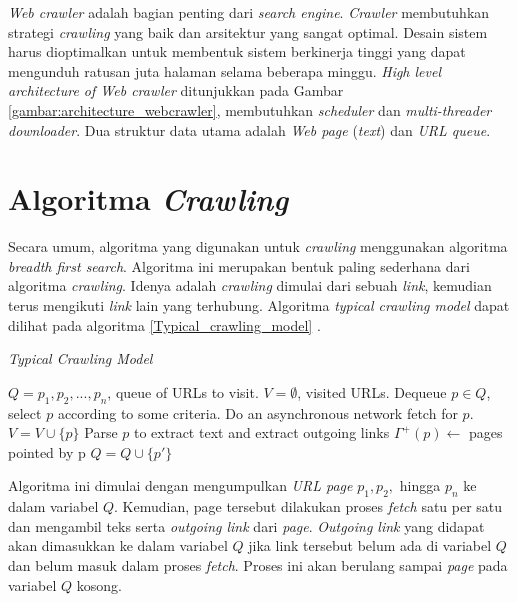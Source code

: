 \emph{Web crawler} adalah bagian penting dari \emph{search engine}. \emph{Crawler} membutuhkan strategi \emph{crawling} yang baik dan arsitektur yang sangat optimal. Desain sistem harus dioptimalkan untuk membentuk sistem berkinerja tinggi yang dapat mengunduh ratusan juta halaman selama beberapa minggu. \emph{High level architecture of Web crawler} ditunjukkan pada Gambar \ref{gambar:architecture_webcrawler}, membutuhkan \emph{scheduler} dan \emph{multi-threader downloader}. Dua struktur data utama adalah \emph{Web page} (\emph{text}) dan \emph{URL queue}.

\section{Algoritma \emph{Crawling}}

Secara umum, algoritma yang digunakan untuk \emph{crawling} menggunakan algoritma \emph{breadth first search}. Algoritma ini merupakan bentuk paling sederhana dari algoritma \textit{crawling}. Idenya adalah \textit{crawling} dimulai dari sebuah \emph{link}, kemudian terus mengikuti \emph{link} lain yang terhubung. Algoritma \emph{typical crawling model} dapat dilihat pada algoritma \ref{Typical_crawling_model} \citep{castillo2005effective}.

\begin{algorithm}[H]
	\caption{\emph{Typical Crawling Model} \citep{castillo2005effective}}
	\label{Typical_crawling_model}
	\begin{algorithmic}[1]
		\State $Q = {p_{1}, p_{2}, ...,p_{n}}$, queue of URLs to visit.
		\State $V =  \emptyset$, visited URLs.
		\State Dequeue $p \in Q$, select $p$ according to some criteria.
		\State Do an asynchronous network fetch for $p$.
		\State $V = V\cup\{p\}$
		\State Parse $p$ to extract text and extract outgoing links
		\State $\Gamma^{+}(p) \gets$ pages pointed by p
			\State $Q = Q \cup \{p'\}$
			\EndIf
		\EndFor
		\EndWhile
	\end{algorithmic}
\end{algorithm}

Algoritma ini dimulai dengan mengumpulkan \textit{URL page} $p_{1}, p_{2},$ hingga $p_{n}$ ke dalam variabel $Q$. Kemudian, page tersebut dilakukan proses \textit{fetch} satu per satu dan mengambil teks serta \textit{outgoing link} dari \textit{page}. \textit{Outgoing link} yang didapat akan dimasukkan ke dalam variabel $Q$ jika link tersebut belum ada di variabel $Q$ dan belum masuk dalam proses \textit{fetch}. Proses ini akan berulang sampai \textit{page} pada variabel $Q$ kosong.

